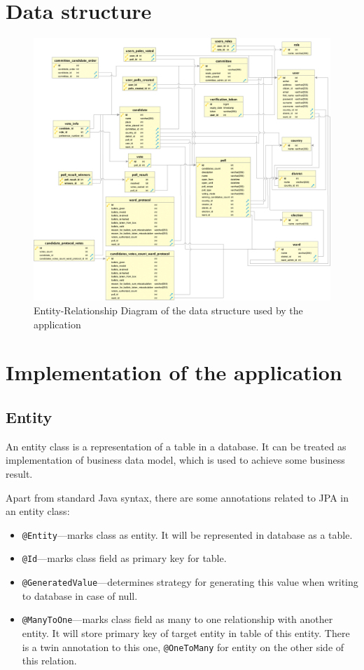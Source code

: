 \documentclass[a4paper,twoside,12pt]{book}
\begin{document}
  \section{Data structure}
    \begin{figure}[h]
      \includegraphics[width=\linewidth]{erd.png}
      \caption{Entity-Relationship Diagram of the data structure used by the application}
      \label{fig:erd}
    \end{figure}

  \section{Implementation of the application}
    \subsection{Entity}
      An entity class is a representation of a table in a database.
      It can be treated as implementation of business data model, which is used to achieve some business result.

      Apart from standard Java syntax, there are some annotations related to JPA in an entity class:
      \begin{itemize}
        \item\lstinline|@Entity|---marks class as entity. It will be represented in database as a table.
        \item\lstinline|@Id|---marks class field as primary key for table.
        \item\lstinline|@GeneratedValue|---determines strategy for generating this value when writing to database in case of null.
        \item\lstinline|@ManyToOne|---marks class field as many to one relationship with another entity. 
        It will store primary key of target entity in table of this entity.
        There is a twin annotation to this one, \lstinline|@OneToMany| for entity on the other side of this relation.
      \end{itemize}
    
\end{document}
